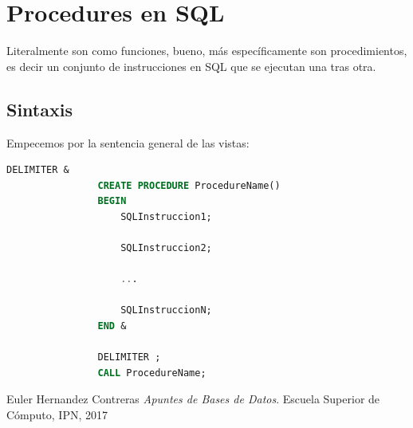 \documentclass[12pt, fleqn]{report}                             %
\begin{document}
    \clearpage
    \chapter{Procedures en SQL}

        Literalmente son como funciones, bueno, más específicamente son procedimientos,
        es decir un conjunto de instrucciones en SQL que se ejecutan una tras otra.


        \section{Sintaxis}

            Empecemos por la sentencia general de las vistas:

            \begin{lstlisting}[language=SQL, gobble=16]
                DELIMITER &
                CREATE PROCEDURE ProcedureName()
                BEGIN
                    SQLInstruccion1;

                    SQLInstruccion2;

                    ...

                    SQLInstruccionN;
                END &

                DELIMITER ;
                CALL ProcedureName;
            \end{lstlisting}











\begin{thebibliography}{10}

        Euler Hernandez Contreras
        \textit{Apuntes de Bases de Datos}. 
        Escuela Superior de Cómputo, IPN, 2017

\end{thebibliography}
\end{document}
